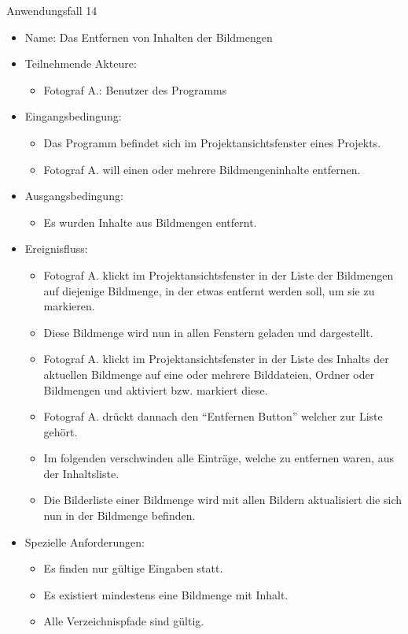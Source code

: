 	\begin{description}
		\item[Anwendungsfall 14]
	\end{description}
	
	\begin{itemize}
		\item Name: Das Entfernen von Inhalten der Bildmengen
		\item Teilnehmende Akteure:
		\begin{itemize}
			\item	Fotograf A.: Benutzer des Programms		
		\end{itemize}
		\item Eingangsbedingung:
		\begin{itemize}
			\item	Das Programm befindet sich im Projektansichtsfenster eines Projekts.
			\item Fotograf A. will einen oder mehrere Bildmengeninhalte entfernen.
		\end{itemize}
		\item Ausgangsbedingung:
		\begin{itemize}
			\item	Es wurden Inhalte aus Bildmengen entfernt.	
		\end{itemize}
		\item Ereignisfluss:
		\begin{itemize}
			\item Fotograf A. klickt im Projektansichtsfenster in der Liste der Bildmengen auf diejenige Bildmenge, in der etwas entfernt werden soll, um sie zu markieren.		
			\item Diese Bildmenge wird nun in allen Fenstern geladen und dargestellt.
			\item Fotograf A. klickt im Projektansichtsfenster in der Liste des Inhalts der aktuellen Bildmenge auf eine oder mehrere Bilddateien, Ordner oder Bildmengen und aktiviert bzw. markiert diese.
			\item Fotograf A. drückt dannach den "`Entfernen Button"' welcher zur Liste gehört.
			\item Im folgenden verschwinden alle Einträge, welche zu entfernen waren, aus der Inhaltsliste.
			\item Die Bilderliste einer Bildmenge wird mit allen Bildern aktualisiert die sich nun in der Bildmenge befinden.
		\end{itemize}
		\item Spezielle Anforderungen:
		\begin{itemize}
			\item	Es finden nur gültige Eingaben statt.
			\item Es existiert mindestens eine Bildmenge mit Inhalt.
			\item Alle Verzeichnispfade sind gültig.
		\end{itemize}			
	\end{itemize}
	
